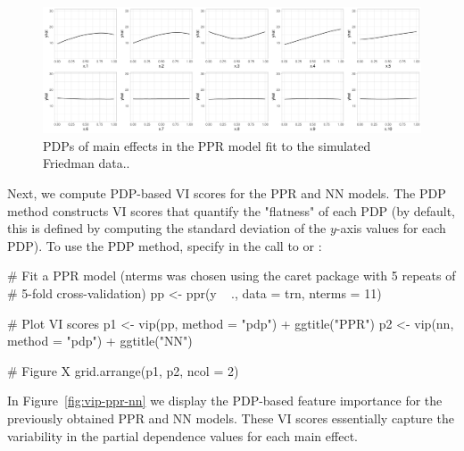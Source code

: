 
\begin{figure}[!htb]
  \centering 
  \includegraphics[width=1\linewidth]{figures/pdp-ppr} 
  \caption{PDPs of main effects in the PPR model fit to the simulated Friedman data..}
  \label{fig:pdp-ppr}
\end{figure}

Next, we compute PDP-based VI scores for the PPR and NN models. The PDP method constructs VI scores that quantify the "flatness" of each PDP (by default, this is defined by computing the standard deviation of the $y$-axis values for each PDP). To use the PDP method, specify  in the call to  or :

\begin{example}
# Fit a PPR model (nterms was chosen using the caret package with 5 repeats of 
# 5-fold cross-validation)
pp <- ppr(y ~ ., data = trn, nterms = 11)  

# Plot VI scores
p1 <- vip(pp, method = "pdp") + ggtitle("PPR")
p2 <- vip(nn, method = "pdp") + ggtitle("NN")

# Figure X
grid.arrange(p1, p2, ncol = 2)
\end{example}

In Figure~\ref{fig:vip-ppr-nn} we display the PDP-based feature importance for the previously obtained PPR and NN models. These VI scores essentially capture the variability in the partial dependence values for each main effect.

